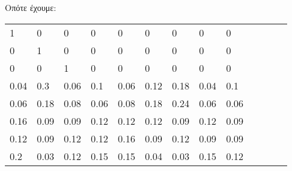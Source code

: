 Οπότε έχουμε:
\begin{table}[h]
    \begin{tabular}{lllllllllllll}
    \cline{1-9}
    \multicolumn{1}{|l|}{1}    & \multicolumn{1}{l|}{0}    & \multicolumn{1}{l|}{0}    & \multicolumn{1}{l|}{0}    & \multicolumn{1}{l|}{0}    & \multicolumn{1}{l|}{0}    & \multicolumn{1}{l|}{0}    & \multicolumn{1}{l|}{0}    & \multicolumn{1}{l|}{0}    &  &  &  &  \\ \cline{1-9}
    \multicolumn{1}{|l|}{0}    & \multicolumn{1}{l|}{1}    & \multicolumn{1}{l|}{0}    & \multicolumn{1}{l|}{0}    & \multicolumn{1}{l|}{0}    & \multicolumn{1}{l|}{0}    & \multicolumn{1}{l|}{0}    & \multicolumn{1}{l|}{0}    & \multicolumn{1}{l|}{0}    &  &  &  &  \\ \cline{1-9}
    \multicolumn{1}{|l|}{0}    & \multicolumn{1}{l|}{0}    & \multicolumn{1}{l|}{1}    & \multicolumn{1}{l|}{0}    & \multicolumn{1}{l|}{0}    & \multicolumn{1}{l|}{0}    & \multicolumn{1}{l|}{0}    & \multicolumn{1}{l|}{0}    & \multicolumn{1}{l|}{0}    &  &  &  &  \\ \cline{1-9}
    \multicolumn{1}{|l|}{0.04} & \multicolumn{1}{l|}{0.3}  & \multicolumn{1}{l|}{0.06} & \multicolumn{1}{l|}{0.1}  & \multicolumn{1}{l|}{0.06} & \multicolumn{1}{l|}{0.12} & \multicolumn{1}{l|}{0.18} & \multicolumn{1}{l|}{0.04} & \multicolumn{1}{l|}{0.1}  &  &  &  &  \\ \cline{1-9}
    \multicolumn{1}{|l|}{0.06} & \multicolumn{1}{l|}{0.18} & \multicolumn{1}{l|}{0.08} & \multicolumn{1}{l|}{0.06} & \multicolumn{1}{l|}{0.08} & \multicolumn{1}{l|}{0.18} & \multicolumn{1}{l|}{0.24} & \multicolumn{1}{l|}{0.06} & \multicolumn{1}{l|}{0.06} &  &  &  &  \\ \cline{1-9}
    \multicolumn{1}{|l|}{0.16} & \multicolumn{1}{l|}{0.09} & \multicolumn{1}{l|}{0.09} & \multicolumn{1}{l|}{0.12} & \multicolumn{1}{l|}{0.12} & \multicolumn{1}{l|}{0.12} & \multicolumn{1}{l|}{0.09} & \multicolumn{1}{l|}{0.12} & \multicolumn{1}{l|}{0.09} &  &  &  &  \\ \cline{1-9}
    \multicolumn{1}{|l|}{0.12} & \multicolumn{1}{l|}{0.09} & \multicolumn{1}{l|}{0.12} & \multicolumn{1}{l|}{0.12} & \multicolumn{1}{l|}{0.16} & \multicolumn{1}{l|}{0.09} & \multicolumn{1}{l|}{0.12} & \multicolumn{1}{l|}{0.09} & \multicolumn{1}{l|}{0.09} &  &  &  &  \\ \cline{1-9}
    \multicolumn{1}{|l|}{0.2}  & \multicolumn{1}{l|}{0.03} & \multicolumn{1}{l|}{0.12} & \multicolumn{1}{l|}{0.15} & \multicolumn{1}{l|}{0.15} & \multicolumn{1}{l|}{0.04} & \multicolumn{1}{l|}{0.03} & \multicolumn{1}{l|}{0.15} & \multicolumn{1}{l|}{0.12} &  &  &  &  \\ \cline{1-9}

\end{tabular}
\end{table}
